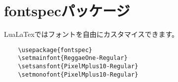 \section{fontspecパッケージ}

LuaLaTexではフォントを自由にカスタマイスできます。

\begin{verbatim}
    \usepackage{fontspec}
    \setmainfont{ReggaeOne-Regular}
    \setsansfont{PixelMplus10-Regular}
    \setmonofont{PixelMplus10-Regular}
\end{verbatim}
